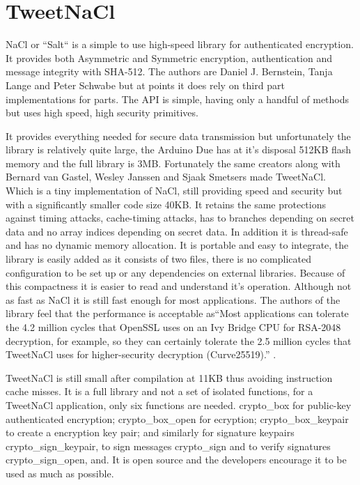 \section{TweetNaCl}

NaCl or ``Salt`` is a simple to use high-speed library for authenticated encryption. It provides both Asymmetric and Symmetric encryption, authentication and message integrity with SHA-512. The authors are Daniel J. Bernstein, Tanja Lange and Peter Schwabe but at points it does rely on third part implementations for parts. The API is simple, having only a handful of methods but uses high speed, high security primitives\cite{naclsmall}.

It provides everything needed for secure data transmission but unfortunately the library is relatively quite large, the Arduino Due has at it's disposal 512KB flash memory and the full library is 3MB. Fortunately the same creators along with Bernard van Gastel, Wesley Janssen and Sjaak Smetsers made TweetNaCl. Which is a tiny implementation of NaCl, still providing speed and security but with a significantly smaller code size 40KB. It retains the same protections against timing attacks, cache-timing attacks, has to branches depending on secret data and no array indices depending on secret data. In addition it is thread-safe and has no dynamic memory allocation\cite{tweetnacl}. It is portable and easy to integrate, the library is easily added as it consists of two files, there is no complicated configuration to be set up or any dependencies on external libraries. Because of this compactness it is easier to read and understand it's operation. Although not as fast as NaCl it is still fast enough for most applications. The authors of the library feel that the performance is acceptable as``Most applications can tolerate the 4.2 million cycles that OpenSSL uses on an Ivy Bridge CPU for RSA-2048 decryption, for example, so they can certainly tolerate the 2.5 million cycles that TweetNaCl uses for higher-security decryption (Curve25519).'' \cite{tweetnacl3}.

TweetNaCl is still small after compilation at 11KB thus avoiding instruction cache misses. It is a full library and not a set of isolated functions, for a TweetNaCl application, only six functions are needed. crypto\_box for public-key authenticated encryption; crypto\_box\_open for ecryption; crypto\_box\_keypair to create a encryption key pair; and similarly for signature keypairs crypto\_sign\_keypair, to sign messages crypto\_sign and to verify signatures crypto\_sign\_open, and. It is open source and the developers encourage it to be used as much as possible. 

